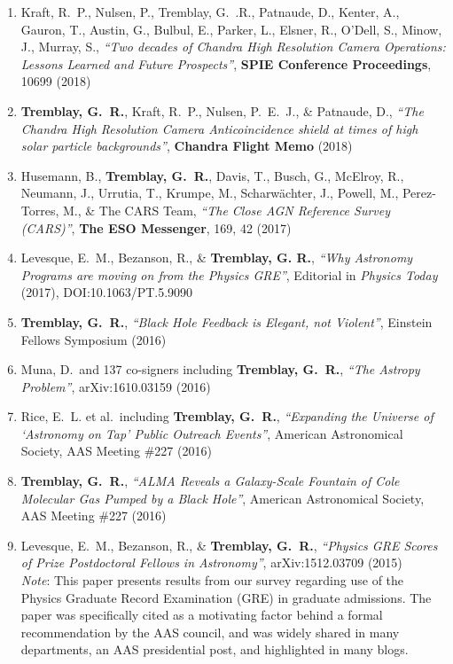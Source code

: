 \documentclass[11pt]{article}
\begin{document}
\begin{enumerate}

\item Kraft, R.~P., Nulsen, P., Tremblay, G.~.R., Patnaude, D., Kenter, A.,
Gauron, T., Austin, G., Bulbul, E., Parker, L., Elsner, R., O'Dell, S.,
Minow, J., Murray, S., \textit{``Two decades of Chandra High Resolution Camera
Operations: Lessons Learned and Future Prospects''}, \textbf{SPIE Conference Proceedings},
10699 (2018)

\item \textbf{Tremblay, G.~R.}, Kraft, R.~P., Nulsen, P.~E.~J.,
\& Patnaude, D., \textit{``The Chandra High Resolution Camera Anticoincidence shield at times of high solar particle backgrounds''}, \textbf{Chandra Flight Memo} (2018)


\item Husemann, B., \textbf{Tremblay, G.~R.}, Davis, T., Busch, G., McElroy, R., Neumann, J., Urrutia, T.,
Krumpe, M., Scharw\"{a}chter, J., Powell, M., Perez-Torres, M., \& The CARS Team, \textit{``The Close AGN Reference Survey (CARS)''}, \textbf{The ESO Messenger}, 169, 42 (2017)

\item Levesque, E.~M., Bezanson, R., \& \textbf{Tremblay, G. R.},
\textit{``Why Astronomy Programs are moving on from the Physics GRE''}, Editorial in \textit{Physics Today} (2017), DOI:10.1063/PT.5.9090

\item \textbf{Tremblay, G.~R.}, \textit{``Black Hole Feedback is Elegant, not Violent''}, Einstein Fellows Symposium (2016)

\item Muna, D.~and 137 co-signers including \textbf{Tremblay, G.~R.},
\textit{``The Astropy Problem''}, arXiv:1610.03159 (2016)


\item Rice, E.~L. et al.~including \textbf{Tremblay, G.~R.}, \textit{``Expanding the Universe of `Astronomy on Tap' Public Outreach Events''}, American Astronomical Society, AAS Meeting \#227 (2016)


\item \textbf{Tremblay, G.~R.}, \textit{``ALMA Reveals a Galaxy-Scale Fountain of Cole Molecular Gas Pumped by a Black Hole''}, American Astronomical Society, AAS Meeting \#227 (2016)

\item Levesque, E.~M., Bezanson, R., \&  \textbf{Tremblay, G.~R.}, \textit{``Physics GRE Scores of Prize Postdoctoral Fellows in Astronomy''}, arXiv:1512.03709 (2015) \\
\textit{Note}: This paper presents results from our survey regarding
use of the Physics Graduate Record Examination (GRE) in graduate admissions. The paper was specifically cited as a motivating factor behind a formal recommendation by the AAS council, and was widely shared in many departments, an AAS presidential post, and highlighted in many blogs.



\end{enumerate}
\end{document}

